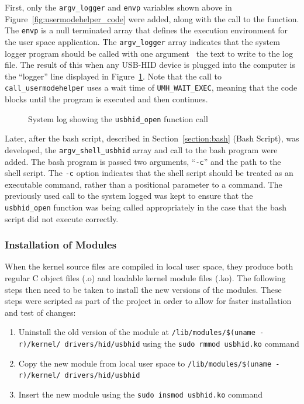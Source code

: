 \documentclass[pagenumbers]{ieee}
\begin{document}
First, only the \texttt{argv\_logger} and \texttt{envp} variables shown above in Figure~\ref{fig:usermodehelper_code} were added, along with the call to the function. The \texttt{envp} is a null terminated array that defines the execution environment for the user space application. The \texttt{argv\_logger} array indicates that the system logger program should be called with one argument \textemdash \ the text to write to the log file. The result of this when any USB-HID device is plugged into the computer is the ``logger'' line displayed in  Figure~\ref{fig:syslog}. Note that the call to \texttt{call\_usermodehelper} uses a wait time of \texttt{UMH\_WAIT\_EXEC}, meaning that the code blocks until the program is executed and then continues.

\begin{figure}[H]
   \caption{System log showing the \texttt{usbhid\_open} function call}
   \label{fig:syslog}
\end{figure}

Later, after the bash script, described in Section~\ref{section:bash} (Bash Script), was developed, the \texttt{argv\_shell\_usbhid} array and call to the bash program were added. The bash program is passed two arguments, ``\texttt{-c}'' and the path to the shell script. The \texttt{-c} option indicates that the shell script should be treated as an executable command, rather than a positional parameter to a command. The previously used call to the system logged was kept to ensure that the \texttt{usbhid\_open} function was being called appropriately in the case that the bash script did not execute correctly. 

\subsubsection{Installation of Modules}

When the kernel source files are compiled in local user space, they produce both regular C object files (.o) and loadable kernel module files (.ko). The following steps then need to be taken to install the new versions of the modules. These steps were scripted as part of the project in order to allow for faster installation and test of changes:

\begin{enumerate}
\item Uninstall the old version of the module at \texttt{/lib/modules/\$(uname -r)/kernel/ drivers/hid/usbhid} using the \texttt{sudo rmmod usbhid.ko} command
\item Copy the new module from local user space to \texttt{/lib/modules/\$(uname -r)/kernel/ drivers/hid/usbhid}
\item Insert the new module using the \texttt{sudo insmod usbhid.ko} command
\end{enumerate} 
\end{document}
